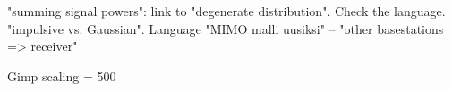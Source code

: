 "summing signal powers": link to "degenerate distribution". Check the language.
"impulsive vs. Gaussian". Language
"MIMO malli uusiksi" – "other basestations => receiver"


Gimp scaling = 500 
